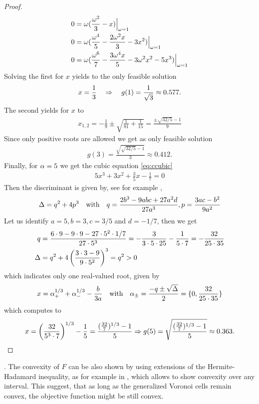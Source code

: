 \documentclass[smallabstract,smallcaptions]{dccpaper}
\newenvironment{remark}{\par\vspace{1.5ex}\noindent{\em Remark\/}.}{\par\vspace{1.5ex}}
\newcounter{example}[section]
\begin{document}
\begin{proof}
\begin{align}
  0 &= \omega(\frac{\omega^2}{3}-x)\Big|_{\omega=1}\\
  0 &= \omega(\frac{\omega^4}{5} -\frac{2\omega^2x}{3} - 3x^2)\Big|_{\omega=1}\\ 
  0 &= \omega(\frac{\omega^6}{7} -\frac{3\omega^4x}{5} - 3\omega^2x^2 -5x^3)\Big|_{\omega=1}\label{eq:ccubic} 
\end{align}
%
Solving the first for $x$  yields to the only feasible solution
%
\begin{align}
  x=\frac{1}{3} \quad\Rightarrow\quad g(1)=\frac{1}{\sqrt{3}}\approx 0.577.
\end{align}
%
The second yields for $x$ to 
%
\begin{align}
  x_{1,2}= -\frac{1}{9} \pm \sqrt{\frac{1}{81}+\frac{1}{15}} = \frac{\pm \sqrt{32/5} -1}{9}
\end{align}
%
Since only positive roots are allowed we get as only feasible solution
%
\begin{align}
  g(3)=\frac{\sqrt{\sqrt{32/5}-1}}{3}\approx 0.412.
\end{align}
%
Finally, for  $\alpha=5$ we get the cubic equation \eqref{eq:ccubic}
%
\begin{align}
  5x^3 + 3 x^2 + \frac{3}{5} x - \frac{1}{7}=0
\end{align}
%
Then the discriminant is given by, see for example \cite[2.3.2]{Zwi03},
%
\begin{align}
  \Delta=q^2+4p^3 \quad\text{with}\quad q=\frac{2b^3-9abc+27a^2d}{27a^3},p=\frac{3ac-b^2}{9a^2}
\end{align}
%
Let us identify $a=5,b=3,c=3/5$ and $d=-1/7$, then we get
%
\begin{align}
  q&=\frac{6\cdot 9-9\cdot 9 - 27\cdot 5^2\cdot1/7}{27\cdot 5^3}
  =-\frac{3}{3\cdot 5\cdot 25} -\frac{1}{5\cdot 7}=-\frac{32}{25\cdot35}\\
  \Delta&=q^2 + 4 \left(\frac{3\cdot 3 -9}{9\cdot 5^2}\right)^3=q^2>0
\end{align}
%
which indicates only one real-valued root, given by
%
\begin{align}
  x=\alpha_+^{1/3}+\alpha_-^{1/3}-\frac{b}{3a} 
  \quad\text{with}\quad  \alpha_{\pm}=\frac{-q\pm\sqrt{\Delta}}{2} = \{0, \frac{32}{25\cdot 35} \}
\end{align}
%
which computes to
%
\begin{align}
  x=\left( \frac{32}{5^3\cdot 7}\right)^{1/3}- \frac{1}{5}
  =\frac{(\frac{32}{7})^{1/3}-1}{5} \Rightarrow g(5)=\sqrt{\frac{(\frac{32}{7})^{1/3}-1}{5}} \approx 0.363.
\end{align}
\fi %
\end{proof}    
%
\fi %
\begin{remark}
  The convexity of $F$ can be also shown by using extensions of the Hermite-Hadamard inequality, as for example in
  \cite{ZC10}, which allows to show convexity over any interval. This suggest, that as long as the generalized Voronoi cells remain
  convex, the objective function might be still convex.  
\end{remark}
\end{document}
